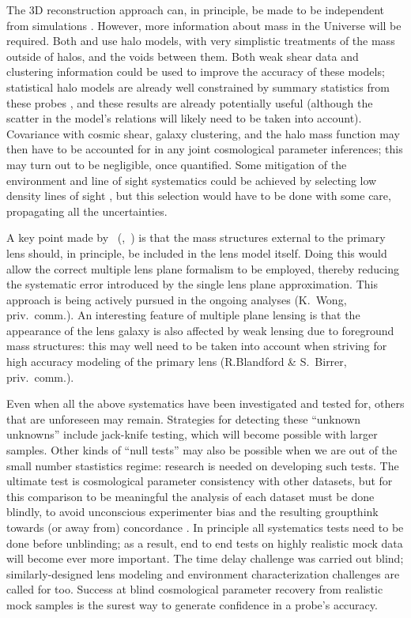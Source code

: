 The 3D reconstruction approach can, in principle, be made to be
independent from simulations \citep[indeed, this was a design feature
of][]{McCullyEtal2014}.  However, more information about mass in the
Universe will be required.  Both \citet{McCullyEtal2014} and
\citet{CollettEtal2013} use halo models, with very simplistic treatments
of the mass outside of halos, and the voids between them. Both weak
shear data and clustering information could be used to improve the
accuracy of these  models; statistical halo models are already well
constrained by summary statistics from these probes
\citep[e.g.][]{CouponEtal2015},  and these results are already
potentially useful (although the scatter in the model's relations
will likely need to be taken into account).  Covariance with cosmic
shear, galaxy clustering, and the halo mass function may then have to
be accounted for in any joint cosmological parameter inferences; this
may turn out to be negligible, once quantified.  Some
mitigation of the environment and line of sight systematics could be
achieved by selecting low density lines of sight
\citep{CollettEtal2013}, but this selection would have to be done with
some care, propagating all the uncertainties.

A key point made by
\citeauthor{McCullyEtal2014}~(\citeyear{McCullyEtal2014},~\citeyear{McCullyEtal2016})
is that the mass structures external to the primary lens should, in
principle, be included in the lens model itself.  Doing this would
allow the correct multiple lens plane formalism to be employed,
thereby reducing the systematic error introduced by the single lens
plane approximation. This approach is being actively pursued in the
ongoing analyses (K.~Wong, priv.\ comm.). An interesting feature of
multiple plane lensing is that the appearance of the lens galaxy is
also affected by weak lensing due to foreground mass structures: this
may well need to be taken into account when striving for high accuracy
modeling of the primary lens (R.Blandford \& S.~Birrer, priv.\ comm.).

Even when all the above systematics have been investigated and tested
for, others that are unforeseen may remain. Strategies for detecting
these ``unknown unknowns'' include jack-knife testing, which  will
become possible with larger samples. Other kinds of ``null tests'' may
also be possible when we are out of the small number stastistics regime:
research is needed on developing such tests. The ultimate test is
cosmological parameter consistency with other datasets, but for this
comparison to be meaningful the analysis of each dataset must be done
blindly, to avoid unconscious experimenter bias and the resulting
groupthink towards (or away from) concordance
\citep[see e.g.][]{Con++06,Suy++13}. In principle all
systematics tests need to be done before unblinding; as a result, end
to end tests on highly realistic mock data will become ever more
important. The time delay challenge was carried out blind;
similarly-designed lens modeling and environment characterization
challenges are called for too. Success at blind cosmological parameter
recovery from realistic mock samples is the surest way to generate
confidence in a probe's accuracy.


